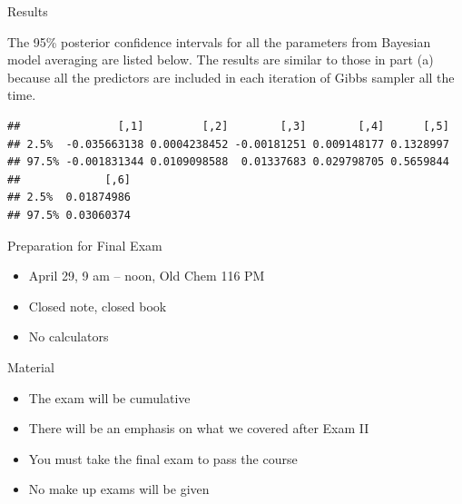 \documentclass[ignorenonframetext,]{beamer}
\newenvironment{Shaded}{\begin{snugshade}}{\end{snugshade}}
\newcommand{\KeywordTok}[1]{\textcolor[rgb]{0.13,0.29,0.53}{\textbf{#1}}}
\newcommand{\DataTypeTok}[1]{\textcolor[rgb]{0.13,0.29,0.53}{#1}}
\newcommand{\DecValTok}[1]{\textcolor[rgb]{0.00,0.00,0.81}{#1}}
\newcommand{\FloatTok}[1]{\textcolor[rgb]{0.00,0.00,0.81}{#1}}
\newcommand{\StringTok}[1]{\textcolor[rgb]{0.31,0.60,0.02}{#1}}
\newcommand{\CommentTok}[1]{\textcolor[rgb]{0.56,0.35,0.01}{\textit{#1}}}
\newcommand{\NormalTok}[1]{#1}
\providecommand{\tightlist}{%
  \setlength{\itemsep}{0pt}\setlength{\parskip}{0pt}}
\begin{document}
\begin{frame}[fragile]{Results}

The 95\% posterior confidence intervals for all the parameters from
Bayesian model averaging are listed below. The results are similar to
those in part (a) because all the predictors are included in each
iteration of Gibbs sampler all the time.

\footnotesize

\begin{Shaded}
\end{Shaded}

\begin{verbatim}
##               [,1]         [,2]        [,3]        [,4]      [,5]
## 2.5%  -0.035663138 0.0004238452 -0.00181251 0.009148177 0.1328997
## 97.5% -0.001831344 0.0109098588  0.01337683 0.029798705 0.5659844
##             [,6]
## 2.5%  0.01874986
## 97.5% 0.03060374
\end{verbatim}

\end{frame}

\begin{frame}{Preparation for Final Exam}

\begin{itemize}
\tightlist
\item
  April 29, 9 am -- noon, Old Chem 116 PM
\item
  Closed note, closed book
\item
  No calculators
\end{itemize}

\end{frame}

\begin{frame}{Material}

\begin{itemize}
\tightlist
\item
  The exam will be cumulative
\item
  There will be an emphasis on what we covered after Exam II
\item
  You must take the final exam to pass the course
\item
  No make up exams will be given
\end{itemize}

\end{frame}
\end{document}
